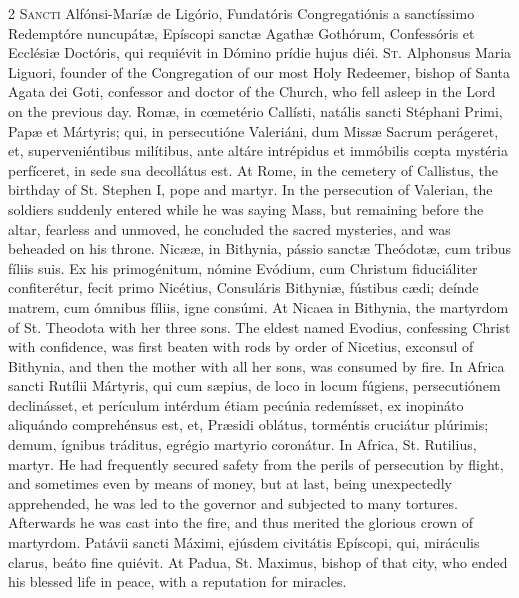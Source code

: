\begin{paracol}{2}
\lettrine[lines=2]{S}{ancti} Alfónsi-Maríæ de 
 Ligório, Fundatóris Congregatiónis a sanctíssimo Redemptóre nuncupátæ, 
 Epíscopi sanctæ Agathæ Gothórum, Confessóris et Ecclésiæ Doctóris, qui 
 requiévit in Dómino prídie hujus diéi.
\switchcolumn
{}
\lettrine[lines=2]{S}{t.} Alphonsus Maria Liguori, founder 
 of the Congregation of our most Holy Redeemer, bishop of Santa Agata dei 
 Goti, confessor and doctor of the Church, who fell asleep in the Lord on the 
 previous day.
\switchcolumn*
{}
Romæ, in cœmetério 
 Callísti, natális sancti Stéphani Primi, Papæ et Mártyris; qui, in 
 persecutióne Valeriáni, dum Missæ Sacrum perágeret, et, superveniéntibus 
 milítibus, ante altáre intrépidus et immóbilis cœpta mystéria perfíceret, in 
 sede sua decollátus est.
\switchcolumn
{}
At Rome, in the cemetery of 
 Callistus, the birthday of St. Stephen I, pope and martyr. In the 
 persecution of Valerian, the soldiers suddenly entered while he was saying 
 Mass, but remaining before the altar, fearless and unmoved, he concluded the 
 sacred mysteries, and was beheaded on his throne.
\switchcolumn*
{}
Nicææ, in Bithynia, 
 pássio sanctæ Theódotæ, cum tribus fíliis suis. Ex his primogénitum, 
 nómine Evódium, cum Christum fiduciáliter confiterétur, fecit primo Nicétius, 
 Consuláris Bithyniæ, fústibus cædi; deínde matrem, cum ómnibus fíliis, igne 
 consúmi.
\switchcolumn
{}
At Nicaea in Bithynia, the martyrdom 
 of St. Theodota with her three sons. The eldest named Evodius, 
 confessing Christ with confidence, was first beaten with rods by order of 
 Nicetius, exconsul of Bithynia, and then the mother with all her sons, was 
 consumed by fire.
\switchcolumn*
{}
In Africa sancti 
 Rutílii Mártyris, qui cum sæpius, de loco in locum fúgiens, persecutiónem 
 declinásset, et perículum intérdum étiam pecúnia redemísset, ex inopináto 
 aliquándo comprehénsus est, et, Præsidi oblátus, torméntis cruciátur 
 plúrimis; demum, ígnibus tráditus, egrégio martyrio coronátur.
\switchcolumn
{}
In Africa, St. Rutilius, martyr. 
 He had frequently secured safety from the perils of persecution by flight, 
 and sometimes even by means of money, but at last, being unexpectedly 
 apprehended, he was led to the governor and subjected to many tortures. 
 Afterwards he was cast into the fire, and thus merited the glorious crown of 
 martyrdom.
\switchcolumn*
{}
Patávii sancti Máximi, 
 ejúsdem civitátis Epíscopi, qui, miráculis clarus, beáto fine quiévit.
\switchcolumn
{}
At Padua, St. Maximus, bishop of 
 that city, who ended his blessed life in peace, with a reputation for 
 miracles.
\switchcolumn*
{}
\end{paracol}



